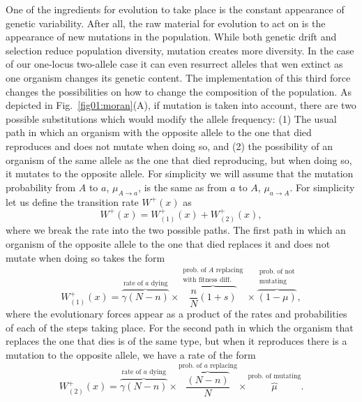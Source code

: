 One of the ingredients for evolution to take place is the constant appearance of
genetic variability. After all, the raw material for evolution to act on is the
appearance of new mutations in the population. While both genetic drift and
selection reduce population diversity, mutation creates more diversity. In the
case of our one-locus two-allele case it can even resurrect alleles that wen
extinct as one organism changes its genetic content. The implementation of this
third force changes the possibilities on how to change the composition of the
population. As depicted in Fig.~\ref{fig01:moran}(A), if mutation is taken into
account, there are two possible substitutions which would modify the allele
frequency: (1) The usual path in which an organism with the opposite allele to
the one that died reproduces and does not mutate when doing so, and (2) the
possibility of an organism of the same allele as the one that died reproducing,
but when doing so, it mutates to the opposite allele. For simplicity we will
assume that the mutation probability from $A$ to $a$, $\mu_{A\rightarrow a}$, is
the same as from $a$ to $A$, $\mu_{a\rightarrow A}$. For simplicity let us
define the transition rate $W^+(x)$ as
\begin{equation}
    W^+(x) = W^+_{(1)}(x) + W^+_{(2)}(x),
\end{equation}
where we break the rate into the two possible paths. The first path in which an
organism of the opposite allele to the one that died replaces it and does not
mutate when doing so takes the form
\begin{equation}
    W^{+}_{(1)}(x) = 
    \overbrace{\gamma(N-n)}^{\text{rate of $a$ dying}}\times
    \overbrace{\frac{n}{N}(1+s)}^
    {\substack{\text{prob. of $A$ replacing}\\ \text{with fitness diff.}}}\times
    \overbrace{(1-\mu)}^
    {\substack{\text{prob. of not} \\ \text{mutating}}},
\end{equation}
where the evolutionary forces appear as a product of the rates and probabilities
of each of the steps taking place. For the second path in which the organism 
that replaces the one that dies is of the same type, but when it reproduces 
there is a mutation to the opposite allele, we have a rate of the form
\begin{equation}
    W^{+}_{(2)}(x) = 
    \overbrace{\gamma(N-n)}^{\text{rate of $a$ dying}}\times
    \overbrace{\frac{(N - n)}{N}}^
    {\text{prob. of $a$ replacing}}\times
    \overbrace{\mu}^{\text{prob. of mutating}}.
\end{equation}
